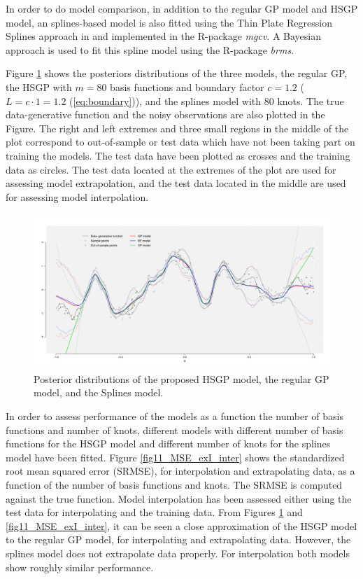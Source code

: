 \documentclass[]{interact}
\theoremstyle{plain}%
\theoremstyle{definition}
\theoremstyle{remark}
\begin{document}
In order to do model comparison, in addition to the regular GP model and HSGP model, an splines-based model is also fitted using the Thin Plate Regression Splines approach in \cite{wood2003thin} and implemented in the R-package \textit{mgcv}. A Bayesian approach is used to fit this spline model using the R-package \textit{brms}.

Figure \ref{fig10_Posteriors_exI} shows the posteriors distributions of the three models, the regular GP, the HSGP with $m=80$ basis functions and boundary factor $c=1.2$ ($L=c\cdot 1= 1.2$ (\ref{eq:boundary})), and the splines model with 80 knots. The true data-generative function and the noisy observations are also plotted in the Figure. The right and left extremes and three small regions in the middle of the plot correspond to out-of-sample or test data which have not been taking part on training the models. The test data have been plotted as crosses and the training data as circles. The test data located at the extremes of the plot are used for assessing model extrapolation, and the test data located in the middle are used for assessing model interpolation.

\begin{figure}
\centering
\includegraphics[width=\textwidth]{fig10_Posteriors_exI.pdf}
\caption{Posterior distributions of the proposed HSGP model, the regular GP model, and the Splines model.}
  \label{fig10_Posteriors_exI}
\end{figure}

In order to assess performance of the models as a function the number of basis functions and number of knots, different models with different number of basis functions for the HSGP model and different number of knots for the splines model have been fitted. Figure \ref{fig11_MSE_exI_inter} shows the  standardized root mean squared error (SRMSE), for interpolation and extrapolating data, as a function of the number of basis functions and knots. The SRMSE is computed against the true function. Model interpolation has been assessed either using the test data for interpolating and the training data. From Figures \ref{fig10_Posteriors_exI} and \ref{fig11_MSE_exI_inter}, it can be seen a close approximation of the HSGP model to the regular GP model, for interpolating and extrapolating data. However, the splines model does not extrapolate data properly. For interpolation both models show roughly similar performance.
\end{document}
